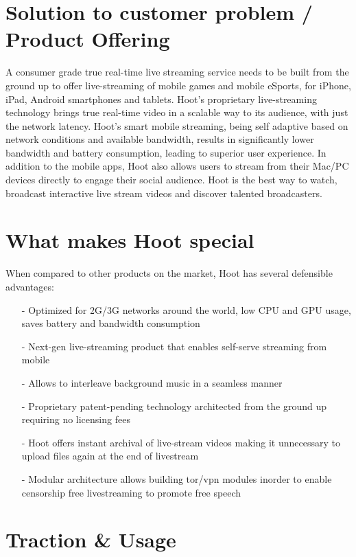 \documentclass{article}
\begin{document}
\section{Solution to customer problem / Product Offering}
A consumer grade true real-time live streaming service needs to be
built from the ground up to offer live-streaming of mobile games and
mobile eSports, for iPhone, iPad, Android smartphones and
tablets. Hoot's proprietary live-streaming technology brings true real-time video in a scalable way to its audience, with just the network latency. Hoot's smart mobile streaming, being self adaptive based on network conditions and available bandwidth, results in significantly lower bandwidth and battery consumption, leading to superior user experience. In addition to the mobile apps, Hoot also allows users to stream from their Mac/PC devices directly to engage their social audience. Hoot is the best way to watch, broadcast interactive live stream videos and discover talented broadcasters.

\section{What makes Hoot special}
When compared to other products on the market, Hoot has several defensible advantages:
\begin{itemize}
\item[-]Optimized for 2G/3G networks around the world, low CPU and GPU usage, saves battery and bandwidth consumption
\item[-]Next-gen live-streaming product that enables self-serve streaming from mobile
\item[-]Allows to interleave background music in a seamless manner
\item[-]Proprietary patent-pending technology architected from the
  ground up requiring no licensing fees
\item[-]Hoot offers instant archival of live-stream videos making it unnecessary to upload files again at the end of livestream
\item[-]Modular architecture allows building tor/vpn modules inorder
  to enable censorship free livestreaming to promote free speech
\end{itemize}


\section{Traction \& Usage}

\end{document}
